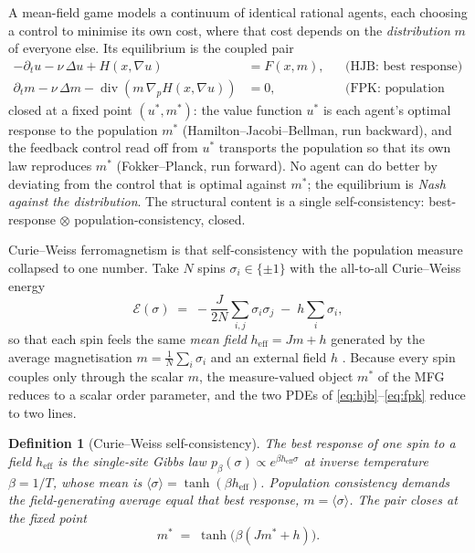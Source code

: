 \documentclass[11pt]{article}
\newtheorem{definition}{Definition}
\newcommand{\avg}[1]{\langle #1 \rangle}
\newcommand{\heff}{h_{\mathrm{eff}}}
\begin{document}
A mean-field game \cite{lasrylions2007} models a continuum of identical rational agents, each choosing a
control to minimise its own cost, where that cost depends on the \emph{distribution} $m$ of everyone else. Its
equilibrium is the coupled pair
\begin{align}
-\partial_t u - \nu\,\Delta u + H\!\left(x,\nabla u\right) &= F(x,m), &&\text{(HJB: best response)} \label{eq:hjb}\\
\partial_t m - \nu\,\Delta m - \operatorname{div}\!\left(m\,\nabla_p H(x,\nabla u)\right) &= 0, &&\text{(FPK: population flow)} \label{eq:fpk}
\end{align}
closed at a fixed point $(u^{*},m^{*})$: the value function $u^{*}$ is each agent's optimal response to the
population $m^{*}$ (Hamilton--Jacobi--Bellman, run backward), and the feedback control read off from $u^{*}$
transports the population so that its own law reproduces $m^{*}$ (Fokker--Planck, run forward). No agent can do
better by deviating from the control that is optimal against $m^{*}$; the equilibrium is \emph{Nash against the
distribution}. The structural content is a single self-consistency: best-response $\otimes$
population-consistency, closed.

Curie--Weiss ferromagnetism is that self-consistency with the population measure collapsed to one number. Take
$N$ spins $\sigma_i\in\{\pm1\}$ with the all-to-all Curie--Weiss energy
\begin{equation}
\mathcal{E}(\sigma) \;=\; -\frac{J}{2N}\sum_{i,j}\sigma_i\sigma_j \;-\; h\sum_i \sigma_i ,
\label{eq:cwenergy}
\end{equation}
so that each spin feels the same \emph{mean field} $\heff = Jm+h$ generated by the average magnetisation
$m=\frac1N\sum_i\sigma_i$ and an external field $h$ \cite{baxter1982}. Because every spin couples only through
the scalar $m$, the measure-valued object $m^{*}$ of the MFG reduces to a scalar order parameter, and the two
PDEs of \eqref{eq:hjb}--\eqref{eq:fpk} reduce to two lines.

\begin{definition}[Curie--Weiss self-consistency]
\label{def:cw}
The \emph{best response} of one spin to a field $\heff$ is the single-site Gibbs law
$p_\beta(\sigma)\propto e^{\beta\heff\sigma}$ at inverse temperature $\beta=1/T$, whose mean is
$\avg{\sigma}=\tanh(\beta\heff)$. \emph{Population consistency} demands the field-generating average equal that
best response, $m=\avg{\sigma}$. The pair closes at the fixed point
\begin{equation}
m^{*} \;=\; \tanh\!\bigl(\beta(Jm^{*}+h)\bigr).
\label{eq:selfconsistent}
\end{equation}
\end{definition}
\end{document}
